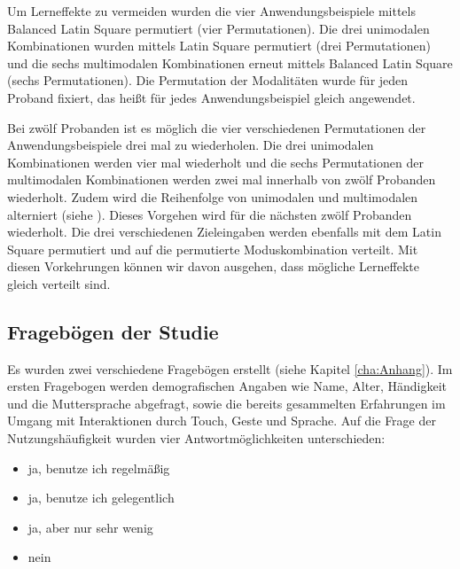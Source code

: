 Um Lerneffekte zu vermeiden wurden die vier Anwendungsbeispiele mittels Balanced Latin Square permutiert (vier Permutationen).
Die drei unimodalen Kombinationen wurden mittels Latin Square permutiert (drei Permutationen) und die sechs multimodalen Kombinationen erneut mittels Balanced Latin Square (sechs Permutationen).
Die Permutation der Modalitäten wurde für jeden Proband fixiert, das heißt für jedes Anwendungsbeispiel gleich angewendet. 

Bei zwölf Probanden ist es möglich die vier verschiedenen Permutationen der Anwendungsbeispiele drei mal zu wiederholen. 
Die drei unimodalen Kombinationen werden vier mal wiederholt und die sechs Permutationen der multimodalen Kombinationen werden zwei mal innerhalb von zwölf Probanden wiederholt. 
Zudem wird die Reihenfolge von unimodalen und multimodalen alterniert (siehe ). 
Dieses Vorgehen wird für die nächsten zwölf Probanden wiederholt. 
Die drei verschiedenen Zieleingaben werden ebenfalls mit dem Latin Square permutiert und auf die permutierte Moduskombination verteilt. 
Mit diesen Vorkehrungen können wir davon ausgehen, dass mögliche Lerneffekte gleich verteilt sind.

\subsection[Fragebögen]{Fragebögen der Studie}
Es wurden zwei verschiedene Fragebögen erstellt (siehe Kapitel \ref{cha:Anhang}). 
Im ersten Fragebogen werden demografischen Angaben wie Name, Alter, Händigkeit und die Muttersprache abgefragt, sowie die bereits gesammelten Erfahrungen im Umgang mit Interaktionen durch Touch, Geste und Sprache. 
Auf die Frage der Nutzungshäufigkeit wurden vier Antwortmöglichkeiten unterschieden:
\begin{itemize}
	\item ja, benutze ich regelmäßig 
	\item ja, benutze ich gelegentlich
	\item ja, aber nur sehr wenig
	\item nein
\end{itemize}

